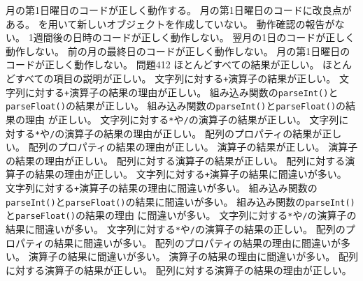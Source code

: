 {{  {月の第1日曜日のコードが正しく動作する。}
  {月の第1日曜日のコードに改良点がある。}
	{を用いて新しいオブジェクトを作成していない。}
  {動作確認の報告がない。}
	}
	{
  {1週間後の日時のコードが正しく動作しない。}
  {翌月の1日のコードが正しく動作しない。}
  {前の月の最終日のコードが正しく動作しない。}
  {月の第1日曜日のコードが正しく動作しない。}
	}
	{問題4}{12}
	{
	{ほとんどすべての結果が正しい。}
	{ほとんどすべての項目の説明が正しい。}
  }
	{
	{文字列に対する\texttt{+}演算子の結果が正しい。}
	{文字列に対する\texttt{+}演算子の結果の理由が正しい。}
	{組み込み関数の\texttt{parseInt()}と\texttt{parseFloat()}の結果が正しい。}
	{組み込み関数の\texttt{parseInt()}と\texttt{parseFloat()}の結果の理由
	が正しい。}
	{文字列に対する\texttt{*}や\texttt{/}の演算子の結果が正しい。}
	{文字列に対する\texttt{*}や\texttt{/}の演算子の結果の理由が正しい。}
	{配列のプロパティの結果が正しい。}
	{配列のプロパティの結果の理由が正しい。}
	{\ElmJ{==}演算子の結果が正しい。}
	{\ElmJ{==}演算子の結果の理由が正しい。}
	{配列に対する\ElmJ{==}演算子の結果が正しい。}
	{配列に対する\ElmJ{==}演算子の結果の理由が正しい。}
	}
	{
	{文字列に対する\texttt{+}演算子の結果に間違いが多い。}
	{文字列に対する\texttt{+}演算子の結果の理由に間違いが多い。}
	{組み込み関数の\texttt{parseInt()}と\texttt{parseFloat()}の結果に間違いが多い。}
	{組み込み関数の\texttt{parseInt()}と\texttt{parseFloat()}の結果の理由
	に間違いが多い。}
	{文字列に対する\texttt{*}や\texttt{/}の演算子の結果に間違いが多い。}
	{文字列に対する\texttt{*}や\texttt{/}の演算子の結果の正しい。}
	{配列のプロパティの結果に間違いが多い。}
	{配列のプロパティの結果の理由に間違いが多い。}
	{\ElmJ{==}演算子の結果に間違いが多い。}
	{\ElmJ{==}演算子の結果の理由に間違いが多い。}
	{配列に対する\ElmJ{==}演算子の結果が正しい。}
	{配列に対する\ElmJ{==}演算子の結果の理由が正しい。}
	}
}
